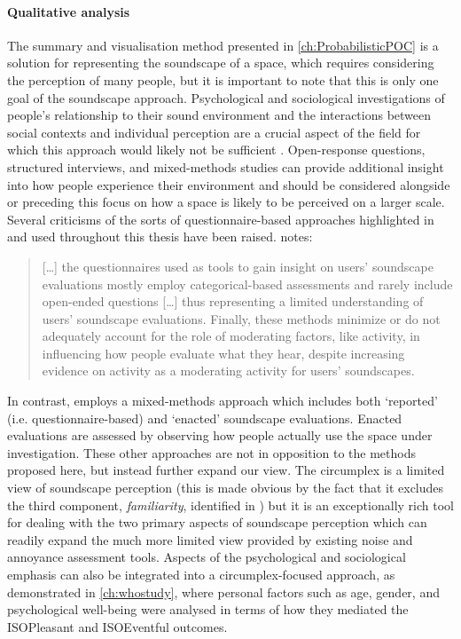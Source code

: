 \paragraph*{Qualitative analysis}

The summary and visualisation method presented in \cref{ch:ProbabilisticPOC} is a solution for representing the soundscape of a space, which requires considering the perception of many people, but it is important to note that this is only one goal of the soundscape approach. Psychological and sociological investigations of people's relationship to their sound environment and the interactions between social contexts and individual perception are a crucial aspect of the field for which this approach would likely not be sufficient \citep{Bild2018Public}. Open-response questions, structured interviews, and mixed-methods studies can provide additional insight into how people experience their environment and should be considered alongside or preceding this focus on how a space is likely to be perceived on a larger scale. Several criticisms of the sorts of questionnaire-based approaches highlighted in \citet{ISO12913Part2} and used throughout this thesis have been raised. \citet{Bild2018Public} notes:

\begin{quote}
  [\dots] the questionnaires used as tools to gain insight on users' soundscape evaluations mostly employ categorical-based assessments and rarely include open-ended questions [\ldots] thus representing a limited understanding of users' soundscape evaluations. Finally, these methods minimize or do not adequately account for the role of moderating factors, like activity, in influencing how people evaluate what they hear, despite increasing evidence on activity as a moderating activity for users' soundscapes.
\end{quote}

In contrast, \citet{Bild2018Public} employs a mixed-methods approach which includes both `reported' (i.e. questionnaire-based) and `enacted' soundscape evaluations. Enacted evaluations are assessed by observing how people actually use the space under investigation. These other approaches are not in opposition to the methods proposed here, but instead further expand our view. The circumplex is a limited view of soundscape perception (this is made obvious by the fact that it excludes the third component, \emph{familiarity}, identified in \citet{Axelsson2010principal}) but it is an exceptionally rich tool for dealing with the two primary aspects of soundscape perception which can readily expand the much more limited view provided by existing noise and annoyance assessment tools. Aspects of the psychological and sociological emphasis can also be integrated into a circumplex-focused approach, as demonstrated in \cref{ch:whostudy}, where personal factors such as age, gender, and psychological well-being were analysed in terms of how they mediated the ISOPleasant and ISOEventful outcomes.

